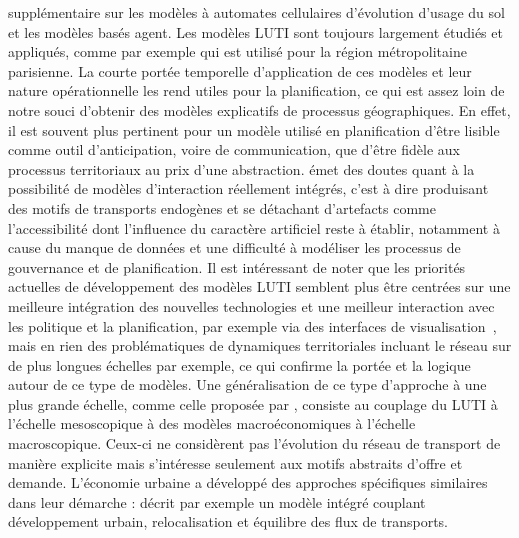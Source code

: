 {supplémentaire sur les modèles à automates cellulaires d'évolution d'usage du sol et les modèles basés agent. Les modèles LUTI sont toujours largement étudiés et appliqués, comme par exemple \cite{delons:hal-00319087} qui est utilisé pour la région métropolitaine parisienne. La courte portée temporelle d'application de ces modèles et leur nature opérationnelle les rend utiles pour la planification, ce qui est assez loin de notre souci d'obtenir des modèles explicatifs de processus géographiques. En effet, il est souvent plus pertinent pour un modèle utilisé en planification d'être lisible comme outil d'anticipation, voire de communication, que d'être fidèle aux processus territoriaux au prix d'une abstraction. \cite{timmermans2003saga} émet des doutes quant à la possibilité de modèles d'interaction réellement intégrés, c'est à dire produisant des motifs de transports endogènes et se détachant d'artefacts comme l'accessibilité dont l'influence du caractère artificiel reste à établir, notamment à cause du manque de données et une difficulté à modéliser les processus de gouvernance et de planification. Il est intéressant de noter que les priorités actuelles de développement des modèles LUTI semblent plus être centrées sur une meilleure intégration des nouvelles technologies et une meilleur interaction avec les politique et la planification, par exemple via des interfaces de visualisation~\cite{JTLU611}, mais en rien des problématiques de dynamiques territoriales incluant le réseau sur de plus longues échelles par exemple, ce qui confirme la portée et la logique autour de ce type de modèles. Une généralisation de ce type d'approche à une plus grande échelle, comme celle proposée par \cite{russo2012unifying}, consiste au couplage du LUTI à l'échelle mesoscopique à des modèles macroéconomiques à l'échelle macroscopique. Ceux-ci ne considèrent pas l'évolution du réseau de transport de manière explicite mais s'intéresse seulement aux motifs abstraits d'offre et demande. L'économie urbaine a développé des approches spécifiques similaires dans leur démarche : \cite{masso2000} décrit par exemple un modèle intégré couplant développement urbain, relocalisation et équilibre des flux de transports.
}








